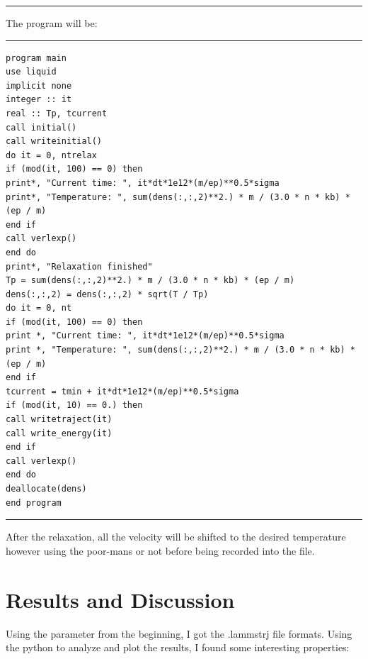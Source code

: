 \documentclass[a4paper]{article}
\begin{document}
\rule{\textwidth}{1pt}
The program will be:

\rule{\textwidth}{1pt}
\begin{lstlisting}
program main
use liquid
implicit none
integer :: it
real :: Tp, tcurrent
call initial()
call writeinitial()
do it = 0, ntrelax
if (mod(it, 100) == 0) then
print*, "Current time: ", it*dt*1e12*(m/ep)**0.5*sigma
print*, "Temperature: ", sum(dens(:,:,2)**2.) * m / (3.0 * n * kb) * (ep / m)
end if
call verlexp()
end do
print*, "Relaxation finished"
Tp = sum(dens(:,:,2)**2.) * m / (3.0 * n * kb) * (ep / m)
dens(:,:,2) = dens(:,:,2) * sqrt(T / Tp)
do it = 0, nt
if (mod(it, 100) == 0) then
print *, "Current time: ", it*dt*1e12*(m/ep)**0.5*sigma
print *, "Temperature: ", sum(dens(:,:,2)**2.) * m / (3.0 * n * kb) * (ep / m)
end if
tcurrent = tmin + it*dt*1e12*(m/ep)**0.5*sigma
if (mod(it, 10) == 0.) then
call writetraject(it)
call write_energy(it)
end if
call verlexp()
end do
deallocate(dens)
end program
\end{lstlisting}
\rule{\textwidth}{1pt}
After the relaxation, all the velocity will be shifted to the desired temperature however using the poor-mans or not before being recorded into the file.
\section{Results and Discussion}
Using the parameter from the beginning, I got the .lammstrj file formats. Using the python to analyze and plot the results, I found some interesting properties:
\end{document}
